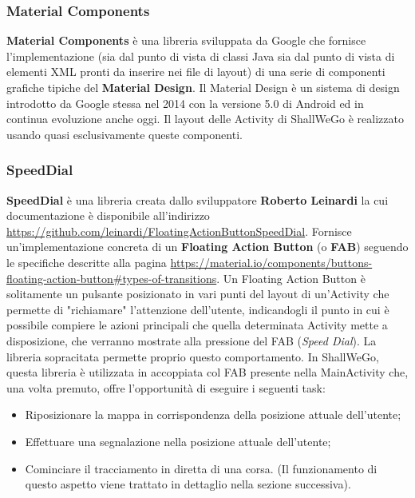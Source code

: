                 \subsubsection{Material Components}
                    \textbf{Material Components} è una libreria sviluppata da Google che fornisce l'implementazione (sia dal punto di vista di classi Java sia dal punto di vista di elementi XML pronti da inserire nei file di layout) di una serie di componenti grafiche tipiche del \textbf{Material Design}. Il Material Design è un sistema di design introdotto da Google stessa nel 2014 con la versione 5.0 di Android ed in continua evoluzione anche oggi. Il layout delle Activity di ShallWeGo è realizzato usando quasi esclusivamente queste componenti.
                
                \subsubsection{SpeedDial}
                    \textbf{SpeedDial} è una libreria creata dallo sviluppatore \textbf{Roberto Leinardi} la cui documentazione è disponibile all'indirizzo \url{https://github.com/leinardi/FloatingActionButtonSpeedDial}. Fornisce un'implementazione concreta di un \textbf{Floating Action Button} (o \textbf{FAB}) seguendo le specifiche descritte alla pagina \url{https://material.io/components/buttons-floating-action-button#types-of-transitions}. Un Floating Action Button è solitamente un pulsante posizionato in vari punti del layout di un'Activity che permette di "richiamare" l'attenzione dell'utente, indicandogli il punto in cui è possibile compiere le azioni principali che quella determinata Activity mette a disposizione, che verranno mostrate alla pressione del FAB (\textit{Speed Dial}). La libreria sopracitata permette proprio questo comportamento. In ShallWeGo, questa libreria è utilizzata in accoppiata col FAB presente nella MainActivity che, una volta premuto, offre l'opportunità di eseguire i seguenti task:

                    \begin{itemize}
                        \item Riposizionare la mappa in corrispondenza della posizione attuale dell'utente;
                        \item Effettuare una segnalazione nella posizione attuale dell'utente;
                        \item Cominciare il tracciamento in diretta di una corsa. (Il funzionamento di questo aspetto viene trattato in dettaglio nella sezione successiva).
                    \end{itemize}

